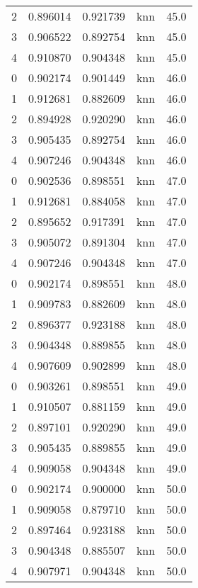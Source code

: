 \begin{tabular}{rrrlr}
     2 & 0.896014 & 0.921739 &      knn &       45.0 \\
     3 & 0.906522 & 0.892754 &      knn &       45.0 \\
     4 & 0.910870 & 0.904348 &      knn &       45.0 \\
     0 & 0.902174 & 0.901449 &      knn &       46.0 \\
     1 & 0.912681 & 0.882609 &      knn &       46.0 \\
     2 & 0.894928 & 0.920290 &      knn &       46.0 \\
     3 & 0.905435 & 0.892754 &      knn &       46.0 \\
     4 & 0.907246 & 0.904348 &      knn &       46.0 \\
     0 & 0.902536 & 0.898551 &      knn &       47.0 \\
     1 & 0.912681 & 0.884058 &      knn &       47.0 \\
     2 & 0.895652 & 0.917391 &      knn &       47.0 \\
     3 & 0.905072 & 0.891304 &      knn &       47.0 \\
     4 & 0.907246 & 0.904348 &      knn &       47.0 \\
     0 & 0.902174 & 0.898551 &      knn &       48.0 \\
     1 & 0.909783 & 0.882609 &      knn &       48.0 \\
     2 & 0.896377 & 0.923188 &      knn &       48.0 \\
     3 & 0.904348 & 0.889855 &      knn &       48.0 \\
     4 & 0.907609 & 0.902899 &      knn &       48.0 \\
     0 & 0.903261 & 0.898551 &      knn &       49.0 \\
     1 & 0.910507 & 0.881159 &      knn &       49.0 \\
     2 & 0.897101 & 0.920290 &      knn &       49.0 \\
     3 & 0.905435 & 0.889855 &      knn &       49.0 \\
     4 & 0.909058 & 0.904348 &      knn &       49.0 \\
     0 & 0.902174 & 0.900000 &      knn &       50.0 \\
     1 & 0.909058 & 0.879710 &      knn &       50.0 \\
     2 & 0.897464 & 0.923188 &      knn &       50.0 \\
     3 & 0.904348 & 0.885507 &      knn &       50.0 \\
     4 & 0.907971 & 0.904348 &      knn &       50.0 \\

\end{tabular}
